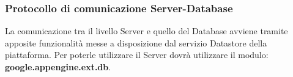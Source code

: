 		\subsubsection{Protocollo di comunicazione Server-Database}
		La comunicazione tra il livello Server e quello del Database avviene tramite apposite funzionalità messe a disposizione dal servizio Datastore della piattaforma. Per poterle utilizzare il Server dovrà utilizzare il modulo: \textbf{google.appengine.ext.db}.


